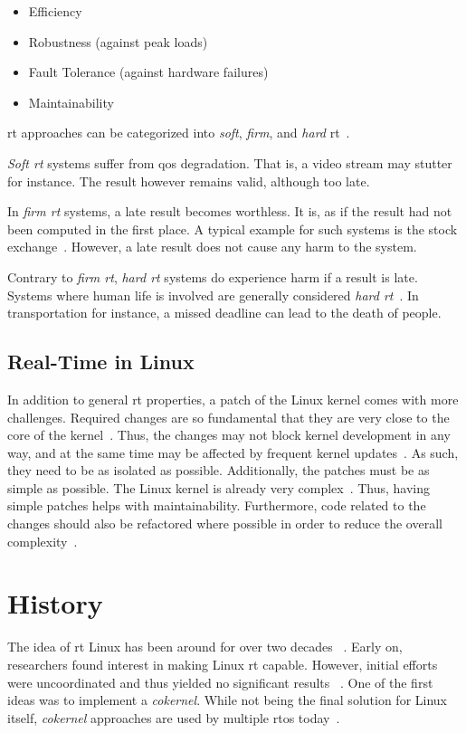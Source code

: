 \documentclass[10pt,twocolumn,a4paper]{article}
\begin{document}
\begin{itemize}
  \item Efficiency
  \item Robustness (against peak loads)
  \item Fault Tolerance (against hardware failures)
  \item Maintainability
\end{itemize}

\acrshort{rt} approaches can be categorized into \emph{soft}, \emph{firm}, and \emph{hard} \acrshort{rt}~\cite{buttazzo_hard_1997}.

\emph{Soft \acrshort{rt}} systems suffer from \acrfull{qos} degradation.
That is, a video stream may stutter for instance.
The result however remains valid, although too late.

In \emph{firm \acrshort{rt}} systems, a late result becomes worthless.
It is, as if the result had not been computed in the first place.
A typical example for such systems is the stock exchange~\cite{reghenzani_realtime_2019}.
However, a late result does not cause any harm to the system.

Contrary to \emph{firm \acrshort{rt}}, \emph{hard \acrshort{rt}} systems do experience harm if a result is late.
Systems where human life is involved are generally considered \emph{hard \acrshort{rt}}~\cite{reghenzani_realtime_2019}.
In transportation for instance, a missed deadline can lead to the death of people.

\subsection{Real-Time in Linux}
In addition to general \acrshort{rt} properties, a patch of the Linux kernel comes with more challenges.
Required changes are so fundamental that they are very close to the core of the kernel~\cite{perlow_trenches_2021}.
Thus, the changes may not block kernel development in any way, and at the same time may be affected by frequent kernel updates~\cite{perlow_trenches_2021}.
As such, they need to be as isolated as possible.
Additionally, the patches must be as simple as possible.
The Linux kernel is already very complex~\cite{shulyupin_linux_map_2025}.
Thus, having simple patches helps with maintainability.
Furthermore, code related to the changes should also be refactored where possible in order to reduce the overall complexity~\cite{perlow_trenches_2021}.


\section{History}
The idea of \acrshort{rt} Linux has been around for over two decades ~\cite{casimiro_how_2000}.
Early on, researchers found interest in making Linux \acrshort{rt} capable.
However, initial efforts were uncoordinated and thus yielded no significant results ~\cite{perlow_trenches_2021}.
One of the first ideas was to implement a \emph{cokernel}.
While not being the final solution for Linux itself, \emph{cokernel} approaches are used by multiple \acrshort{rtos} today~\cite{reghenzani_realtime_2019}.
\end{document}
